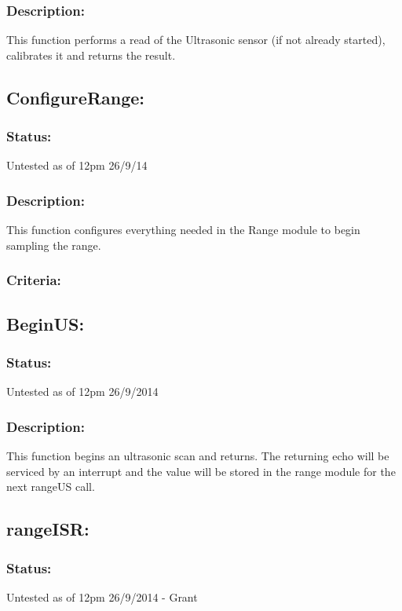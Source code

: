 \documentclass[]{article}
\begin{document}
\subsubsection{Description:}
This function performs a read of the Ultrasonic sensor (if not already started), calibrates it and returns the result.

\subsection{ConfigureRange:}
\subsubsection{Status:}
Untested as of 12pm 26/9/14

\subsubsection{Description:}
This function configures everything needed in the Range module to begin sampling the range.

\subsubsection{Criteria:}

\subsection{BeginUS:}
\subsubsection{Status:}
Untested as of 12pm 26/9/2014

\subsubsection{Description:}
This function begins an ultrasonic scan and returns. The returning echo will be serviced by an interrupt and the value will be stored in the range module for the next rangeUS call.

\subsection{rangeISR:}
\subsubsection{Status:}
Untested as of 12pm 26/9/2014 - Grant
\end{document}
